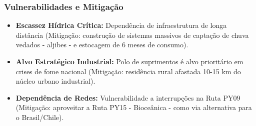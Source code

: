 \subsubsection{Vulnerabilidades e
Mitigação}

\begin{itemize}
\tightlist
\item
  \textbf{Escassez Hídrica Crítica:} Dependência de infraestrutura de
  longa distância (Mitigação: construção de sistemas massivos de
  captação de chuva vedados - aljibes - e estocagem de 6 meses de
  consumo).
\item
  \textbf{Alvo Estratégico Industrial:} Polo de suprimentos é alvo
  prioritário em crises de fome nacional (Mitigação: residência rural
  afastada 10-15 km do núcleo urbano industrial).
\item
  \textbf{Dependência de Redes:} Vulnerabilidade a interrupções na Ruta
  PY09 (Mitigação: aproveitar a Ruta PY15 - Bioceânica - como via
  alternativa para o Brasil/\allowbreak Chile).
\end{itemize}

